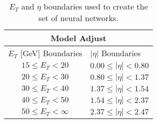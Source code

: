

\begin{table}[htb]
\begin{center}
	{\small
	\begin{tabular}{cccc}
		\hline \hline
		\multicolumn{4}{c}{Model Adjust}                                                                 \\ \hline
		\multicolumn{2}{c|}{$E_T$ {[}GeV{]} Boundaries} & \multicolumn{2}{l}{$|\eta|$ Boundaries}        \\ \hline
		\multicolumn{2}{c|}{$15 \leq E_T < 20 $}        & \multicolumn{2}{l}{$0.00 \leq |\eta| < 0.80 $}   \\
		\multicolumn{2}{c|}{$20 \leq E_T < 30 $}        & \multicolumn{2}{l}{$0.80 \leq |\eta| < 1.37 $}  \\
		\multicolumn{2}{c|}{$30 \leq E_T < 40 $}        & \multicolumn{2}{l}{$1.37 \leq |\eta| < 1.54 $} \\
		\multicolumn{2}{c|}{$40 \leq E_T < 50 $}        & \multicolumn{2}{l}{$1.54 \leq |\eta| < 2.37 $} \\
		\multicolumn{2}{c|}{$50 \leq E_T < \infty $}    & \multicolumn{2}{l}{$2.37 \leq |\eta| < 2.47 $} \\ \hline \hline
	\end{tabular}
}
\end{center}
\caption{$E_T$ and $\eta$ boundaries used to create the set of neural networks.}
\label{tab:ensemble_regions}
\end{table}